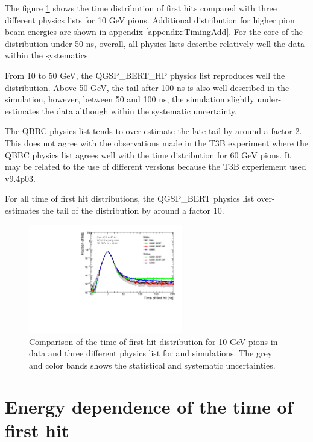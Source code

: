 The figure \ref{fig:dNdt_SimData_10GeV} shows the time distribution of first hits compared with three different physics lists for 10 GeV pions. Additional distribution for higher pion beam energies are shown in appendix \ref{appendix:TimingAdd}. For the core of the distribution under 50 ns, overall, all physics lists describe relatively well the data within the systematics.

From 10 to 50 GeV, the QGSP\_BERT\_HP physics list reproduces well the distribution. Above 50 GeV, the tail after 100 ns is also well described in the simulation, however, between 50 and 100 ns, the simulation slightly under-estimates the data although within the systematic uncertainty.

The QBBC physics list tends to over-estimate the late tail by around a factor 2. This does not agree with the observations made in the T3B experiment where the QBBC physics list agrees well with the time distribution for 60 GeV pions. It may be related to the use of different \geant versions because the T3B experiement used \geant v9.4p03.

For all time of first hit distributions, the QGSP\_BERT physics list over-estimates the tail of the distribution by around a factor 10.

\begin{figure}[htbp!]
	\centering
	\includegraphics[width=0.6\textwidth]{../Thesis_Plots/Timing/Pions/Plots/Comparison_SimData_Pion10GeV_LateClusters.pdf}
	\caption{Comparison of the time of first hit distribution for 10 GeV pions in data and three different physics list for \mokka and \ddhep simulations. The grey and color bands shows the statistical and systematic uncertainties.}
	\label{fig:dNdt_SimData_10GeV}
\end{figure}

\section{Energy dependence of the time of first hit}

